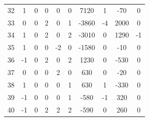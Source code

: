\begin{table}[!htb]
{\begin{tabular}{cccccccccc}
		32    & 1     & 0     & 0     & 0     & 0     & 7120  & 1     & -70   & 0 \\
		33    & 0     & 0     & 2     & 0     & 1     & -3860 & -4    & 2000  & 0 \\
		34    & 1     & 0     & 2     & 0     & 2     & -3010 & 0     & 1290  & -1 \\
		35    & 1     & 0     & 0     & -2    & 0     & -1580 & 0     & -10   & 0 \\
		36    & -1    & 0     & 2     & 0     & 2     & 1230  & 0     & -530  & 0 \\
		37    & 0     & 0     & 0     & 2     & 0     & 630   & 0     & -20   & 0 \\
		38    & 1     & 0     & 0     & 0     & 1     & 630   & 1     & -330  & 0 \\
		39    & -1    & 0     & 0     & 0     & 1     & -580  & -1    & 320   & 0 \\
		40    & -1    & 0     & 2     & 2     & 2     & -590  & 0     & 260   & 0 \\
		\bottomrule
	\end{tabular}}%
	\label{table:coefs_nut}
\end{table}%

